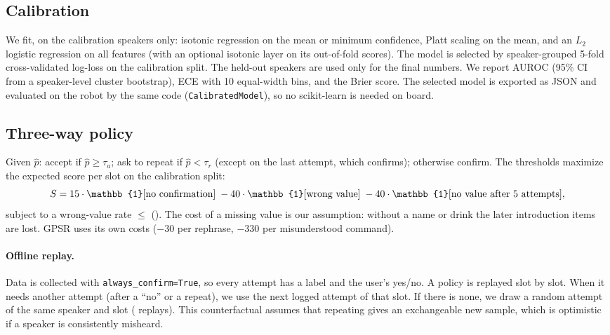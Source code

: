 \documentclass[10pt,a4paper]{article}
\newcommand{\code}[1]{\texttt{#1}}
\begin{document}
\subsection{Calibration}
We fit, on the calibration speakers only: isotonic regression on the mean or minimum confidence, Platt
scaling on the mean, and an $L_2$ logistic regression on all features (with an optional isotonic layer on its
out-of-fold scores). The model is selected by speaker-grouped 5-fold cross-validated log-loss on the
calibration split. The held-out speakers are used only for the final numbers. We report AUROC (95\% CI from a
speaker-level cluster bootstrap), ECE with 10 equal-width bins, and the Brier score. The selected model is
exported as JSON and evaluated on the robot by the same code (\code{CalibratedModel}), so no scikit-learn is
needed on board.

\subsection{Three-way policy}
Given $\hat p$: accept if $\hat p\ge\tau_a$; ask to repeat if $\hat p<\tau_r$ (except on the last attempt,
which confirms); otherwise confirm. The thresholds maximize the expected score per slot on the calibration
split:
\begin{equation}
  S = \PolicyCostBonus\cdot\mathbb{1}[\text{no confirmation}] \; \PolicyCostWrong\cdot\mathbb{1}[\text{wrong value}]
      \; \PolicyCostMissing\cdot\mathbb{1}[\text{no value after \PolicyRetries{} attempts}],
\end{equation}
subject to a wrong-value rate $\le$ \PolicyMaxWrong{} (\PolicyMaxWrongRule). The cost of a missing value is
our assumption: without a name or drink the later introduction items are lost. GPSR uses its own costs
($-30$ per rephrase, $-330$ per misunderstood command).

\paragraph{Offline replay.} Data is collected with \code{always\_confirm=True}, so every attempt has a label
and the user's yes/no. A policy is replayed slot by slot. When it needs another attempt (after a ``no'' or a
repeat), we use the next logged attempt of that slot. If there is none, we draw a random attempt of the same
speaker and slot (\PolicySims{} replays). This counterfactual assumes that repeating gives an exchangeable
new sample, which is optimistic if a speaker is consistently misheard.
\end{document}

